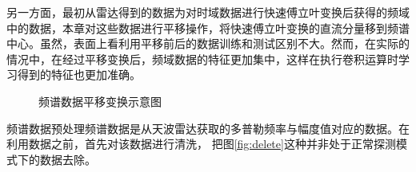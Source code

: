 另一方面，最初从雷达得到的数据为对时域数据进行快速傅立叶变换后获得的频域中的数据，本章对这些数据进行平移操作，将快速傅立叶变换的直流分量移到频谱中心。虽然，表面上看利用平移前后的数据训练和测试区别不大。然而，在实际的情况中，在经过平移变换后，频域数据的特征更加集中，这样在执行卷积运算时学习得到的特征也更加准确。
\begin{figure}[hbt]
	\centering
	\hfil

	\caption{频谱数据平移变换示意图}
	\label{fig:fft}
\end{figure}

频谱数据预处理频谱数据是从天波雷达获取的多普勒频率与幅度值对应的数据。在利用数据之前，首先对该数据进行清洗，
把图\ref{fig:delete}这种并非处于正常探测模式下的数据去除。

